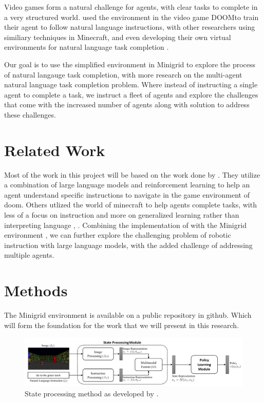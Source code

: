 \documentclass[11pt]{article}
\begin{document}
Video games form a natural challenge for agents, with clear tasks to complete in a very structured world. \cite{Chaplot2017} used the environment in the video game DOOM\texttrademark to train their agent to follow natural language instructions, with other researchers using similiary techniques in Minecraft\texttrademark \cite{Tessler2020}, and even developing their own virtual environments for natural language task completion \cite{Anderson2017} \cite{Wang2024}. 

Our goal is to use the simplified environment in Minigrid \cite{MinigridMiniworld23} to explore the process of natural langauge task completion, with more research on the multi-agent natural language task completion problem. Where instead of instructing a single agent to complete a task, we instruct a fleet of agents and explore the challenges that come with the increased number of agents along with solution to address these challenges. 

\section{Related Work}
Most of the work in this project will be based on the work done by \cite{Chaplot2017}. They utilize a combination of large language models and reinforcement learning to help an agent understand specific instructions to navigate in the game environment of doom. Others utlized the world of minecraft to help agents complete tasks, with less of a focus on instruction and more on generalized learning rather than interpreting language \cite{Oh2017}, \cite{Tessler2020}. Combining the implementation of \cite{Chaplot2017} with the Minigrid environment \cite{MinigridMiniworld23}, \cite{chevalier2018babyai} we can further explore the challenging problem of robotic instruction with large language models, with the added challenge of addressing multiple agents.

\section{Methods}

The Minigrid environment is available on a public repository in github. Which will form the foundation for the work that we will present in this research. 

\begin{figure}[!t]
  \centering
  \includegraphics[width=\linewidth]{figs/stateprocessing.png}
  \caption{State processing method as developed by \cite{Chaplot2017}.}
  \label{fig:stateprocess}
\end{figure}
\end{document}
